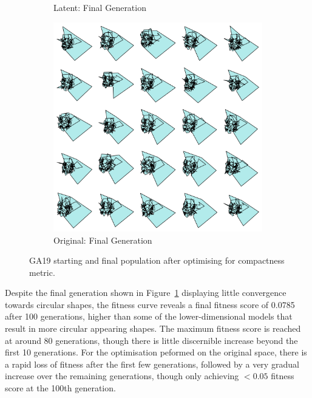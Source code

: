 \documentclass{article}
\begin{document}
\begin{figure}[H]
\begin{subfigure}[b]{0.32\textwidth}
        \caption{Latent: Final Generation}
        \label{fig:GA19_latent_final}
    \end{subfigure}
    \hfill
    \begin{subfigure}[b]{0.32\textwidth}
        \centering
        \includegraphics[width=\textwidth]{figures/GAResults/GA19/original/original_final_gen.png}
        \caption{Original: Final Generation}
        \label{fig:GA19_original_final}
    \end{subfigure}
    \caption{GA19 starting and final population after optimising for compactness metric.}
    \label{fig:GA19_before_after_GA}
\end{figure}

Despite the final generation shown in Figure~\ref{fig:GA19_latent_final} displaying little convergence towards circular shapes, the fitness curve reveals a final fitness score of 0.0785 after 100 generations, higher than some of the lower-dimensional models that result in more circular appearing shapes. The maximum fitness score is reached at around 80 generations, though there is little discernible increase beyond the first 10 generations. For the optimisation peformed on the original space, there is a rapid loss of fitness after the first few generations, followed by a very gradual increase over the remaining generations, though only achieving $<0.05$ fitness score at the 100th generation.
\end{document}

